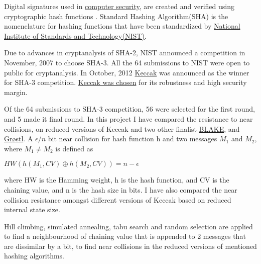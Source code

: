 \begin{abstractpage}

Digital signatures used in \href{"http://en.wikipedia.org/wiki/Cryptographic\_hash\_function\#Applications"}
{computer security}, are created and verified using cryptographic hash functions \cite{00042}.
Standard Hashing Algorithm(SHA) is the nomenclature for hashing functions that have been standardized
by \href{"http://www.nist.gov/index.html"}{National Institute of Standards and Technology(NIST)}.

Due to advances in cryptanalysis of SHA-2, NIST announced a competition in November, 2007 to choose SHA-3. 
All the 64 submissions to NIST were open to public for cryptanalysis. 
In October, 2012 \href{"http://keccak.noekeon.org/"}{Keccak} was announced as the winner for SHA-3 competition. 
\href{"http://csrc.nist.gov/groups/ST/hash/sha-3/sha-3\_selection\_announcement.pdf"}{Keccak was chosen}
for its robustness and high security margin.

Of the 64 submissions to SHA-3 competition, 56 were selected for the first round, and 5 made it final round.
In this project I have compared the resistance to near collisions, on reduced versions of Keccak and two other
finalist \href{"https://131002.net/blake/"}{BLAKE}, and \href{"http://www.groestl.info/"}{Gr{\o}stl}. 
A $\epsilon / n $ bit near collision for hash function h and two messages $M_{1}$ and $M_{2}$, where
$M_{1} \neq M_{2}$ is defined as
\begin{center}$HW( h( M_{1}, CV ) \oplus h( M_{2}, CV ) ) = n - \epsilon $\end{center}
where HW is the Hamming weight, h is the hash function, and CV is the chaining value, and n is the hash size 
in bits. I have also compared the near collision resistance amongst different versions of Keccak based on 
reduced internal state size.

Hill climbing, simulated annealing, tabu search and random selection are applied to find a neighbourhood of chaining
value that is appended to 2 messages that are dissimilar by a bit, to find near collisions in the reduced versions of
mentioned hashing algorithms.
  
\end{abstractpage}
